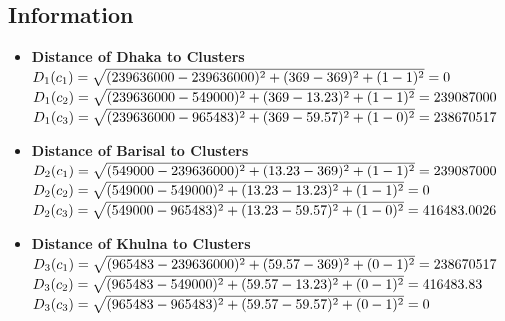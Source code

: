 \documentclass[conference]{IEEEtran}
\begin{document}
\subsection{Information}
\begin{itemize}
    \item \textbf{Distance of Dhaka to Clusters} \\
    $D_1(c_1) = \\ \sqrt{(239636000 - 239636000)^2 + (369 - 369)^2 + (1 - 1)^2} \\ = 0$ \\
    $D_1(c_2) = \\ \sqrt{(239636000 - 549000)^2 + (369 - 13.23)^2 + (1 - 1)^2} \\ = 239087000$ \\
    $D_1(c_3) = \\ \sqrt{(239636000 - 965483)^2 + (369 - 59.57)^2 + (1 - 0)^2} \\ = 238670517$

    \item \textbf{Distance of Barisal to Clusters} \\
    $D_2(c_1) = \\ \sqrt{(549000 - 239636000)^2 + (13.23 - 369)^2 + (1 - 1)^2} \\ = 239087000$ \\
    $D_2(c_2) = \\ \sqrt{(549000 - 549000)^2 + (13.23 - 13.23)^2 + (1 - 1)^2} \\ = 0$ \\
    $D_2(c_3) = \\ \sqrt{(549000 - 965483)^2 + (13.23 - 59.57)^2 + (1 - 0)^2} \\ = 416483.0026$

    \item \textbf{Distance of Khulna to Clusters} \\
    $D_3(c_1) = \\ \sqrt{(965483 - 239636000)^2 + (59.57 - 369)^2 + (0 - 1)^2} \\ = 238670517$ \\
    $D_3(c_2) = \\ \sqrt{(965483 - 549000)^2 + (59.57 - 13.23)^2 + (0 - 1)^2} \\ = 416483.83$ \\
    $D_3(c_3) = \\ \sqrt{(965483 - 965483)^2 + (59.57 - 59.57)^2 + (0 - 1)^2} \\ = 0$ 
\end{itemize}
\end{document}
